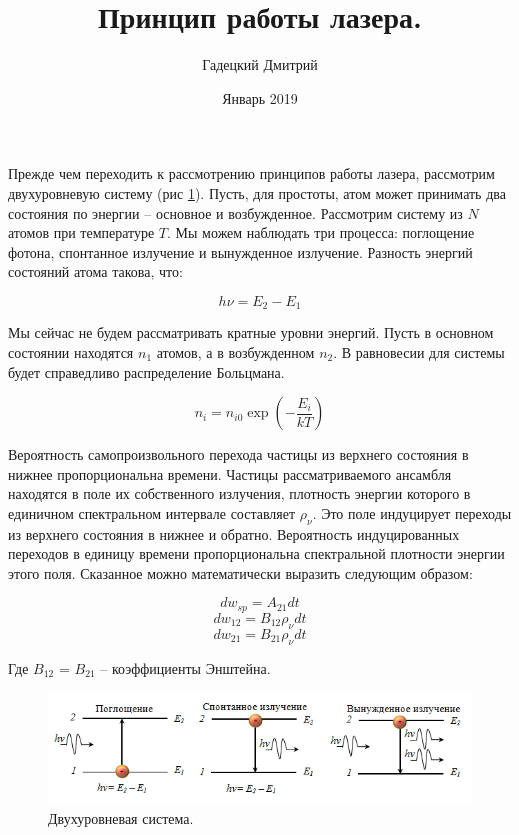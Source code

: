 \documentclass[a4paper,12pt]{article}
\title{Принцип работы лазера.}
\author{Гадецкий Дмитрий}
\date{Январь 2019}
\theoremstyle{plain} %
\theoremstyle{definition} %
\theoremstyle{remark} %
\begin{document}
Прежде чем переходить к рассмотрению принципов работы лазера, рассмотрим двухуровневую систему (рис \ref{fig:2sistem}). Пусть, для простоты, атом может принимать два состояния по энергии -- основное и возбужденное.
Рассмотрим систему из $N$ атомов при температуре $T$. 
Мы можем наблюдать три процесса: поглощение фотона, спонтанное излучение и вынужденное излучение. Разность энергий состояний атома такова, что:

\begin{equation}
h\nu = E_2-E_1
\label{eq_1}
\end{equation}

Мы сейчас не будем рассматривать кратные уровни энергий.
Пусть в основном состоянии находятся $n_1$ атомов, а в возбужденном $n_2$. В равновесии для системы будет справедливо распределение Больцмана.

\begin{equation}
n_i = n_{i0}\exp(-\frac{E_i}{kT})
\end{equation}

Вероятность самопроизвольного перехода частицы из верхнего состояния в нижнее пропорциональна времени. 
Частицы рассматриваемого ансамбля находятся в поле их собственного излучения, плотность энергии которого в единичном спектральном интервале составляет $\rho_{\nu}$. Это поле индуцирует переходы из верхнего состояния в нижнее и обратно.
Вероятность индуцированных переходов в единицу времени пропорциональна спектральной плотности энергии этого поля. Сказанное можно математически выразить следующим образом:

\begin{equation}
dw_{sp} = A_{21}dt
\end{equation}
\begin{equation}
dw_{12} = B_{12}\rho_{\nu}dt
\end{equation}
\begin{equation}
dw_{21} = B_{21}\rho_{\nu}dt
\end{equation}

Где $B_{12}$ = $B_{21}$ -- коэффициенты Энштейна.

\begin{figure}[h]
	\includegraphics[width=\linewidth]{pict1.png}
	\caption{Двухуровневая система.}
	\label{fig:2sistem}
\end{figure}
\end{document}
